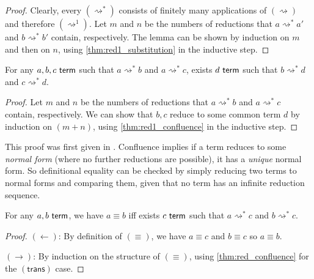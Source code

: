 \documentclass[twoside]{report}
\begin{document}
\begin{proof}
    Clearly, every $(\rightsquigarrow^\ast)$ consists of finitely many applications of $(\rightsquigarrow)$ and therefore $(\rightsquigarrow^1)$. Let $m$ and $n$ be the numbers of reductions that $a\rightsquigarrow^\ast a'$ and $b\rightsquigarrow^\ast b'$ contain, respectively. The lemma can be shown by induction on $m$ and then on $n$, using \cref{thm:red1_substitution} in the inductive step.
\end{proof}

\begin{proposition}
    \label{thm:red_confluence}
    For any $a,b,c \ \mathsf{term}$ such that $a\rightsquigarrow^\ast b$ and $a\rightsquigarrow^\ast c$, exists $d \ \mathsf{term}$ such that $b\rightsquigarrow^\ast d$ and $c\rightsquigarrow^\ast d$.
\end{proposition}

\begin{proof}
    Let $m$ and $n$ be the numbers of reductions that $a\rightsquigarrow^\ast b$ and $a\rightsquigarrow^\ast c$ contain, respectively. We can show that $b, c$ reduce to some common term $d$ by induction on $(m + n)$, using \cref{thm:red1_confluence} in the inductive step.
\end{proof}

This proof was first given in \cite{martin1998intuitionistic}. Confluence implies if a term reduces to some \emph{normal form} (where no further reductions are possible), it has a \emph{unique} normal form. So definitional equality can be checked by simply reducing two terms to normal forms and comparing them, given that no term has an infinite reduction sequence.

\begin{proposition}
    \label{thm:characterisation_of_defeq}
    For any $a, b \ \mathsf{term}$, we have $a \equiv b$ iff exists $c \ \mathsf{term}$ such that $a\rightsquigarrow^\ast c$ and $b\rightsquigarrow^\ast c$.
\end{proposition}

\begin{proof}
    $(\leftarrow)$: By definition of $(\equiv)$, we have $a \equiv c$ and $b \equiv c$ so $a \equiv b$.

    $(\rightarrow)$: By induction on the structure of $(\equiv)$, using \cref{thm:red_confluence} for the $(\mathsf{trans})$ case.
\end{proof}
\end{document}
